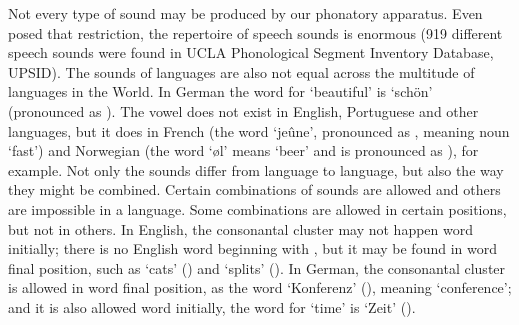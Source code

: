 Not every type of sound may be produced by our phonatory apparatus. Even posed that restriction, the repertoire of speech sounds is enormous (919 different speech sounds were found in UCLA Phonological Segment Inventory Database, UPSID). The sounds of languages are also not equal across the multitude of languages in the World. In German the word for `beautiful' is `schön' (pronounced as \textipa{[S\o:n]}). The vowel \textipa{[\o]} does not exist in English, Portuguese and other languages, but it does in French (the word `jeûne', pronounced as \textipa{[Z\o n]}, meaning noun `fast') and Norwegian (the word `\o l' means `beer' and is pronounced as \textipa{[\o l]}), for example. Not only the sounds differ from language to language, but also the way they might be combined. Certain combinations of sounds are allowed and others are impossible in a language. Some combinations are allowed in certain positions, but not in others. In English, the consonantal cluster \textipa{[ts]} 
may not happen word initially; there is no English word beginning with \textipa{[ts]}, but it may be found in word final position, such as `cats' (\textipa{[k\ae ts]}) and `splits' (\textipa{[splits]}). In German, the consonantal cluster is allowed in word final position, as the word `Konferenz' (), meaning `conference'; and it is also allowed word initially, the word for `time' is `Zeit' (\textipa{[tsaIt]}).

